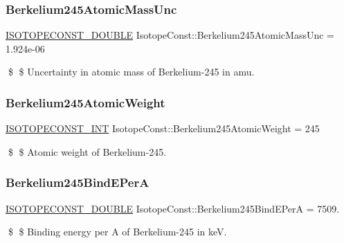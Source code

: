 \subsubsection{\texorpdfstring{Berkelium245\+Atomic\+Mass\+Unc}{Berkelium245AtomicMassUnc}}
{\footnotesize\ttfamily \mbox{\hyperlink{group___isotope_const-_macros_ga8f45a7272ce02c0b4c65c44636ed719a}{I\+S\+O\+T\+O\+P\+E\+C\+O\+N\+S\+T\+\_\+\+D\+O\+U\+B\+LE}} Isotope\+Const\+::\+Berkelium245\+Atomic\+Mass\+Unc = 1.\+924e-\/06}

\$ \$ Uncertainty in atomic mass of Berkelium-\/245 in amu. \mbox{\label{group___isotope_const-_berkelium-_bk245_ga51add281ee1dfb8c9c98df07dfb1d860}} 
\subsubsection{\texorpdfstring{Berkelium245\+Atomic\+Weight}{Berkelium245AtomicWeight}}
{\footnotesize\ttfamily \mbox{\hyperlink{group___isotope_const-_macros_ga5f18360b3e99483a35c32d789e62621c}{I\+S\+O\+T\+O\+P\+E\+C\+O\+N\+S\+T\+\_\+\+I\+NT}} Isotope\+Const\+::\+Berkelium245\+Atomic\+Weight = 245}

\$ \$ Atomic weight of Berkelium-\/245. \mbox{\label{group___isotope_const-_berkelium-_bk245_gad861eb992107b09d46aa8fd06ba9dbe6}} 
\subsubsection{\texorpdfstring{Berkelium245\+Bind\+E\+PerA}{Berkelium245BindEPerA}}
{\footnotesize\ttfamily \mbox{\hyperlink{group___isotope_const-_macros_ga8f45a7272ce02c0b4c65c44636ed719a}{I\+S\+O\+T\+O\+P\+E\+C\+O\+N\+S\+T\+\_\+\+D\+O\+U\+B\+LE}} Isotope\+Const\+::\+Berkelium245\+Bind\+E\+PerA = 7509.}

\$ \$ Binding energy per A of Berkelium-\/245 in keV. \mbox{\label{group___isotope_const-_berkelium-_bk245_ga3a01f92cef53f1eeb8093d0056770b32}} 
